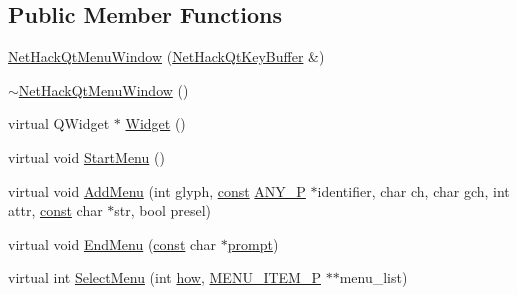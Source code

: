 \subsection*{Public Member Functions}
\begin{DoxyCompactItemize}
\item 
\hyperlink{classNetHackQtMenuWindow_a360bf14964c4c13d2cb733b26254b5e0}{Net\+Hack\+Qt\+Menu\+Window} (\hyperlink{classNetHackQtKeyBuffer}{Net\+Hack\+Qt\+Key\+Buffer} \&)
\item 
\hyperlink{classNetHackQtMenuWindow_a60d58c13e7482de47fcf14c626c66a1d}{$\sim$\+Net\+Hack\+Qt\+Menu\+Window} ()
\item 
virtual Q\+Widget $\ast$ \hyperlink{classNetHackQtMenuWindow_af178a7bd0aaf759f776082465a2da9fc}{Widget} ()
\item 
virtual void \hyperlink{classNetHackQtMenuWindow_a7b9f6a7128a5bb8a9e048b4dc836ff33}{Start\+Menu} ()
\item 
virtual void \hyperlink{classNetHackQtMenuWindow_a908dfd4178b82765ed5f4ecc54ef8a94}{Add\+Menu} (int glyph, \hyperlink{tradstdc_8h_a2c212835823e3c54a8ab6d95c652660e}{const} \hyperlink{wintype_8h_ae29f750de92b8a7c2566957e5863fbed}{A\+N\+Y\+\_\+\+P} $\ast$identifier, char ch, char gch, int attr, \hyperlink{tradstdc_8h_a2c212835823e3c54a8ab6d95c652660e}{const} char $\ast$str, bool presel)
\item 
virtual void \hyperlink{classNetHackQtMenuWindow_aecc622ba72a6541ca41b25d6f0ed7498}{End\+Menu} (\hyperlink{tradstdc_8h_a2c212835823e3c54a8ab6d95c652660e}{const} char $\ast$\hyperlink{classNetHackQtMenuWindow_a469aff3117dff7ccd1e985caefbe1378}{prompt})
\item 
virtual int \hyperlink{classNetHackQtMenuWindow_a4c5f158e59e0d9abc76f6247d5ca7fec}{Select\+Menu} (int \hyperlink{classNetHackQtMenuWindow_aeedf5ff2753872ccbcaf8680f0b6071b}{how}, \hyperlink{wintype_8h_a56b56557611b7f64f4e6585a1b78c8f9}{M\+E\+N\+U\+\_\+\+I\+T\+E\+M\+\_\+\+P} $\ast$$\ast$menu\+\_\+list)
\end{DoxyCompactItemize}
